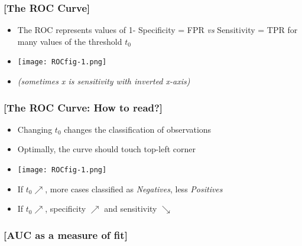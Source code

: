 \documentclass[xcolor=x11names,compress]{beamer}
\renewcommand{\(}{\begin{columns}}
\renewcommand{\)}{\end{columns}}
\newcommand{\<}[1]{\begin{column}{#1}}
\renewcommand{\>}{\end{column}}
\begin{document}
\begin{frame} %
\frametitle{\textcolor{brique}{[The ROC Curve]}}
\pause
 \begin{itemize}[<+->]
  \item[] The ROC represents values of 1- Specificity =  FPR  \textit{vs} Sensitivity =  TPR for many values of the threshold $t_0$
  \item[] \begin{center}\texttt{[image: ROCfig-1.png]} \end{center}
  \item \textit{(sometimes  x is sensitivity  with inverted x-axis)}
\end{itemize}
\end{frame}

\begin{frame} %
\frametitle{\textcolor{brique}{[The ROC Curve: How to read?]}}
\pause
 \begin{itemize}[<+->]
  \item[] Changing $t_0$ changes the classification of observations
  \item  Optimally, the curve should touch top-left corner
  \item[] \begin{center}\texttt{[image: ROCfig-1.png]} \end{center}
  \item If $t_0  \nearrow $,  more cases  classified as \textit{Negatives}, less \textit{Positives}
  \item If $t_0  \nearrow $,   specificity  $\nearrow $ and sensitivity $\searrow$
\end{itemize}
\end{frame}

\begin{frame} %
\frametitle{\textcolor{brique}{[AUC as a measure of fit]}}
\end{frame}

%
%
%
\end{document}
